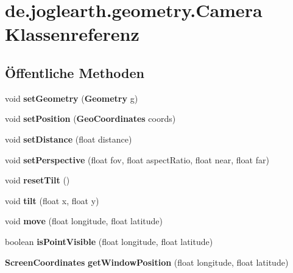 \section{de.\-joglearth.\-geometry.\-Camera Klassenreferenz}
\label{classde_1_1joglearth_1_1geometry_1_1_camera}
\subsection*{Öffentliche Methoden}
\begin{DoxyCompactItemize}
\item 
void {\bfseries set\-Geometry} ({\bf Geometry} g)\label{classde_1_1joglearth_1_1geometry_1_1_camera_a7a517b53cbcfabacfeaed8fd6c8b5b63}

\item 
void {\bfseries set\-Position} ({\bf Geo\-Coordinates} coords)\label{classde_1_1joglearth_1_1geometry_1_1_camera_accb57080d3b54b039dd2c319888456d0}

\item 
void {\bfseries set\-Distance} (float distance)\label{classde_1_1joglearth_1_1geometry_1_1_camera_a91501d291640449b54807bf43e5ab497}

\item 
void {\bfseries set\-Perspective} (float fov, float aspect\-Ratio, float near, float far)\label{classde_1_1joglearth_1_1geometry_1_1_camera_aaf3be68eef79b33d4660c6fd525c92f2}

\item 
void {\bfseries reset\-Tilt} ()\label{classde_1_1joglearth_1_1geometry_1_1_camera_ab06fa6de4a7d086eea9d11ed94936b8c}

\item 
void {\bfseries tilt} (float x, float y)\label{classde_1_1joglearth_1_1geometry_1_1_camera_a7c04c717c5ec8c97c0b1ecc274470402}

\item 
void {\bfseries move} (float longitude, float latitude)\label{classde_1_1joglearth_1_1geometry_1_1_camera_aaeb2da7bffd20340f028c0a7ceb60be9}

\item 
boolean {\bfseries is\-Point\-Visible} (float longitude, float latitude)\label{classde_1_1joglearth_1_1geometry_1_1_camera_a2b521b573c3d26ef15cdf5ae8d7fb455}

\item 
{\bf Screen\-Coordinates} {\bfseries get\-Window\-Position} (float longitude, float latitude)\label{classde_1_1joglearth_1_1geometry_1_1_camera_a041be2bdb6da8e78bd306f415d20a332}


\end{DoxyCompactItemize}
